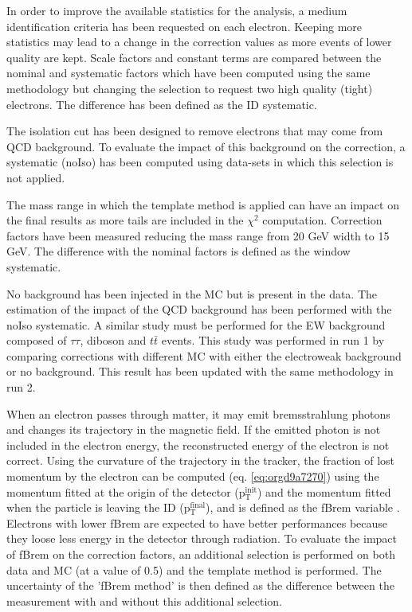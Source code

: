 In order to improve the available statistics for the analysis, a medium identification criteria has been requested on each electron.
Keeping more statistics may lead to a change in the correction values as more events of lower quality are kept.
Scale factors and constant terms are compared between the nominal and systematic factors which have been computed using the same methodology but changing the selection to request two high quality (tight) electrons.
The difference has been defined as the ID systematic.

The isolation cut has been designed to remove electrons that may come from QCD background.
To evaluate the impact of this background on the correction, a systematic (noIso) has been computed using data-sets in which this selection is not applied.

The mass range in which the template method is applied can have an impact on the final results as more tails are included in the $\chi^2$ computation.
Correction factors have been measured reducing the mass range from 20 GeV width to 15 GeV.
The difference with the nominal factors is defined as the window systematic.

No background has been injected in the MC but is present in the data.
The estimation of the impact of the QCD background has been performed with the noIso systematic.
A similar study must be performed for the EW background composed of \(\tau \tau\), diboson and \(t\bar{t}\) events.
This study was performed in run 1 by comparing corrections with different MC with either the electroweak background or no background.
This result has been updated with the same methodology in run 2.

When an electron passes through matter, it may emit bremsstrahlung photons and changes its trajectory in the magnetic field.
If the emitted photon is not included in the electron energy, the reconstructed energy of the electron is not correct.
Using the curvature of the trajectory in the tracker, the fraction of lost momentum by the electron can be computed (eq. \ref{eq:orgd9a7270}) using the momentum fitted at the origin of the detector (p\(_{\text{T}}^{\text{init}}\)) and the momentum fitted when the particle is leaving the ID (p\(_{\text{T}}^{\text{final}}\)), and is defined as the fBrem variable \cite{ATL-COM-PHYS-2013-1653}.
Electrons with lower fBrem are expected to have better performances because they loose less energy in the detector through radiation.
To evaluate the impact of fBrem on the correction factors, an additional selection is performed on both data and MC (at a value of 0.5) and the template method is performed.
The uncertainty of the 'fBrem method' is then defined as the difference between the measurement with and without this additional selection.

